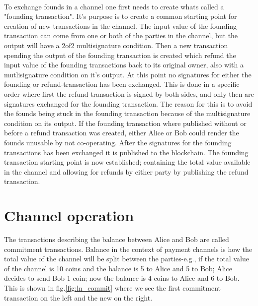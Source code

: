 \documentclass[informationsecurity]{gucmasterproject}
\begin{document}
\paragraph{}
To exchange founds in a channel one first needs to create whats called a "founding transaction". It's purpose is to create a common starting point for creation of new transactions in the channel. The input value of the founding transaction can come from one or both of the parties in the channel, but the output will have a 2of2 multisignature condition. Then a new transaction spending the output of the founding transaction is created which refund the input value of the founding transactions back to its original owner, also with a mutlisignature condition on it's output. At this point no signatures for either the founding or refund-transaction has been exchanged. This is done in a specific order where first the refund transaction is signed by both sides, and only then are signatures exchanged for the founding transaction. The reason for this is to avoid the founds being stuck in the founding transaction because of the multisignature condition on its output. If the founding transaction where published without or before a refund transaction was created, either Alice or Bob could render the founds unusable by not co-operating. After the signatures for the founding transactions has been exchanged it is published to the blockchain. The founding transaction starting point is now established; containing the total value available in the channel and allowing for refunds by either party by publishing the refund transaction.

\section{Channel operation}

The transactions describing the balance between Alice and Bob are called commitment transactions. Balance in the context of payment channels is how the total value of the channel will be split between the parties-e.g., if the total value of the channel is 10 coins and the balance is 5 to Alice and 5 to Bob; Alice decides to send Bob 1 coin; now the balance is 4 coins to Alice and 6 to Bob. This is shown in fig.\ref{fig:ln_commit} where we see the first commitment transaction on the left and the new on the right.
\end{document}
